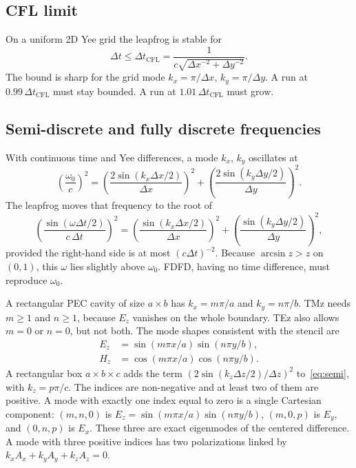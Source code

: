 \documentclass[11pt,a4paper]{article}
\numberwithin{equation}{section}
\begin{document}
\subsection{CFL limit}
\label{sec:cfl}

On a uniform 2D Yee grid the leapfrog is stable for
\begin{equation}
\Delta t \le \Delta t_{\mathrm{CFL}}
= \frac{1}{c\sqrt{\Delta x^{-2}+\Delta y^{-2}}}.
\label{eq:cfl}
\end{equation}
The bound is sharp for the grid mode $k_x=\pi/\Delta x$, $k_y=\pi/\Delta y$.
A run at $0.99\,\Delta t_{\mathrm{CFL}}$ must stay bounded. A run at
$1.01\,\Delta t_{\mathrm{CFL}}$ must grow.

\subsection{Semi-discrete and fully discrete frequencies}
\label{sec:dispersion}

With continuous time and Yee differences, a mode $k_x$, $k_y$ oscillates at
\begin{equation}
\left(\frac{\omega_0}{c}\right)^2
=
\left(\frac{2\sin(k_x\Delta x/2)}{\Delta x}\right)^2
+
\left(\frac{2\sin(k_y\Delta y/2)}{\Delta y}\right)^2.
\label{eq:semi}
\end{equation}
The leapfrog moves that frequency to the root of
\begin{equation}
\left(\frac{\sin(\omega\Delta t/2)}{c\,\Delta t}\right)^2
=
\left(\frac{\sin(k_x\Delta x/2)}{\Delta x}\right)^2
+
\left(\frac{\sin(k_y\Delta y/2)}{\Delta y}\right)^2,
\label{eq:discrete}
\end{equation}
provided the right-hand side is at most $(c\Delta t)^{-2}$. Because
$\arcsin z>z$ on $(0,1)$, this $\omega$ lies slightly above $\omega_0$.
FDFD, having no time difference, must reproduce $\omega_0$.

A rectangular PEC cavity of size $a\times b$ has $k_x=m\pi/a$ and
$k_y=n\pi/b$. TMz needs $m\ge 1$ and $n\ge 1$, because $E_z$ vanishes on the
whole boundary. TEz also allows $m=0$ or $n=0$, but not both. The mode shapes
consistent with the stencil are
\begin{align}
E_z &= \sin(m\pi x/a)\sin(n\pi y/b), \label{eq:mode-tm}\\
H_z &= \cos(m\pi x/a)\cos(n\pi y/b). \label{eq:mode-te}
\end{align}
A rectangular box $a\times b\times c$ adds the term
$(2\sin(k_z\Delta z/2)/\Delta z)^2$ to~\eqref{eq:semi}, with
$k_z=p\pi/c$. The indices are non-negative and at least two of them are
positive. A mode with exactly one index equal to zero is a single
Cartesian component: $(m,n,0)$ is $E_z=\sin(m\pi x/a)\sin(n\pi y/b)$,
$(m,0,p)$ is $E_y$, and $(0,n,p)$ is $E_x$. These three are exact
eigenmodes of the centered difference. A mode with three positive indices
has two polarizations linked by $k_x A_x+k_y A_y+k_z A_z=0$.
\end{document}
